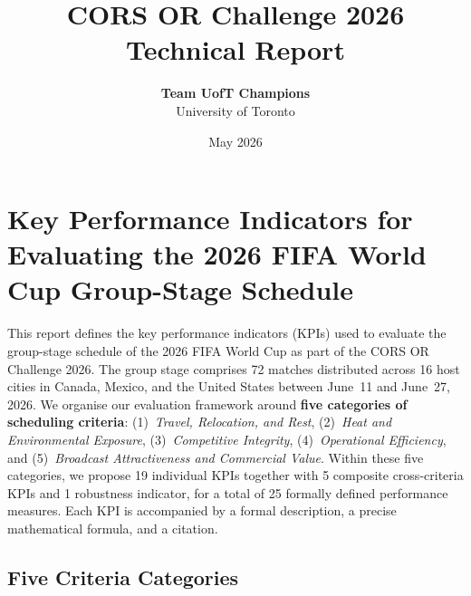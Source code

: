 \documentclass[12pt, letterpaper]{article}
\title{%
  \LARGE\textbf{CORS OR Challenge 2026 \textendash{} Technical Report}
}
\author{%
  \textbf{Team UofT Champions}\\[4pt]
  \small University of Toronto
}
\date{May 2026}
\begin{document}

\maketitle
\thispagestyle{empty}
\vspace{10pt}

\vspace{6pt}
\newpage

\section{Key Performance Indicators for Evaluating the 2026 FIFA
         World Cup Group-Stage Schedule}

This report defines the key performance indicators (KPIs) used
to evaluate the group-stage schedule of the 2026 FIFA World Cup as part
of the CORS OR Challenge 2026.  The group stage comprises 72 matches
distributed across 16 host cities in Canada, Mexico, and the United States
between June~11 and June~27, 2026.  We organise our evaluation framework
around \textbf{five categories of scheduling criteria}: (1)~\emph{Travel,
Relocation, and Rest}, (2)~\emph{Heat and Environmental Exposure},
(3)~\emph{Competitive Integrity}, (4)~\emph{Operational Efficiency}, and
(5)~\emph{Broadcast Attractiveness and Commercial Value}.  Within these five
categories, we propose 19 individual KPIs together with 5 composite
cross-criteria KPIs and 1 robustness indicator, for a total of 25 formally
defined performance measures.  Each KPI is accompanied by a formal
description, a precise mathematical formula, and a citation.

\subsection{Five Criteria Categories}
\end{document}
